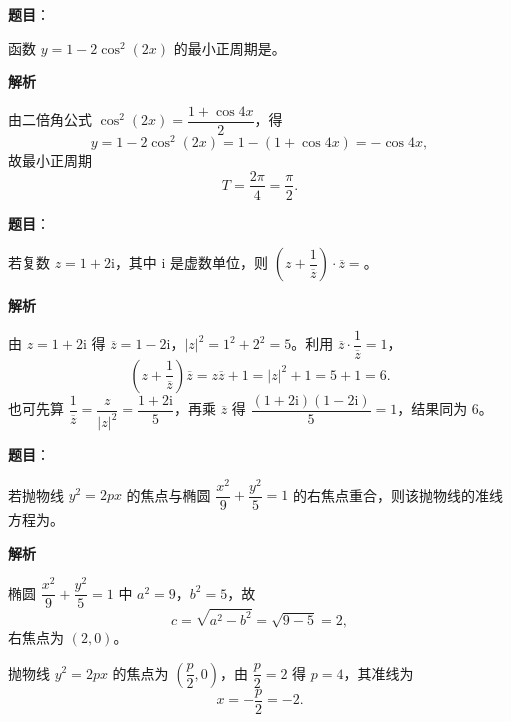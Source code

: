

\begin{answer}

\textbf{题目}：

函数 $y=1-2\cos^2(2x)$ 的最小正周期是\gkblank{}。

\textbf{解析}

由二倍角公式 $\cos^2(2x)=\dfrac{1+\cos4x}{2}$，得
\nopagebreak[4]
\[y=1-2\cos^2(2x)=1-(1+\cos4x)=-\cos4x,\]
故最小正周期
\nopagebreak[4]
\[T=\frac{2\pi}{4}=\frac\pi2 .\]


\end{answer}
\begin{answer}

\textbf{题目}：

若复数 $z=1+2\mathrm i$，其中 $\mathrm i$ 是虚数单位，则 $\left(z+\dfrac1{\overline z}\right)\cdot\overline z=$\gkblank{}。

\textbf{解析}

由 $z=1+2\mathrm i$ 得 $\overline z=1-2\mathrm i$，$|z|^2=1^2+2^2=5$。利用 $\overline z\cdot\dfrac1{\overline z}=1$，
\nopagebreak[4]
\[\left(z+\frac1{\overline z}\right)\overline z=z\overline z+1=|z|^2+1=5+1=6 .\]
也可先算 $\dfrac1{\overline z}=\dfrac{z}{|z|^2}=\dfrac{1+2\mathrm i}5$，再乘 $\overline z$ 得 $\dfrac{(1+2\mathrm i)(1-2\mathrm i)}5=1$，结果同为 $6$。


\end{answer}
\begin{answer}

\textbf{题目}：

若抛物线 $y^2=2px$ 的焦点与椭圆 $\dfrac{x^2}{9}+\dfrac{y^2}{5}=1$ 的右焦点重合，则该抛物线的准线方程为\gkblank{}。

\textbf{解析}

椭圆 $\dfrac{x^2}9+\dfrac{y^2}5=1$ 中 $a^2=9$，$b^2=5$，故
\nopagebreak[4]
\[c=\sqrt{a^2-b^2}=\sqrt{9-5}=2,\]
右焦点为 $(2,0)$。

抛物线 $y^2=2px$ 的焦点为 $\left(\dfrac p2,0\right)$，由 $\dfrac p2=2$ 得 $p=4$，其准线为
\nopagebreak[4]
\[x=-\frac p2=-2 .\]


\end{answer}
